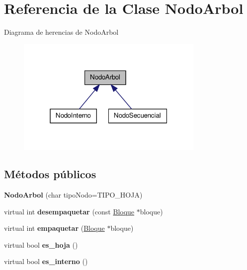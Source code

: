 \hypertarget{class_nodo_arbol}{\section{\-Referencia de la \-Clase \-Nodo\-Arbol}
\label{class_nodo_arbol}
}


\-Diagrama de herencias de \-Nodo\-Arbol
\nopagebreak
\begin{figure}[H]
\begin{center}
\leavevmode
\includegraphics[width=256pt]{class_nodo_arbol__inherit__graph}
\end{center}
\end{figure}
\subsection*{\-Métodos públicos}
\begin{DoxyCompactItemize}
\item 
\hypertarget{class_nodo_arbol_a875a3c766141d83399eb0df1d544fc82}{{\bfseries \-Nodo\-Arbol} (char tipo\-Nodo=\-T\-I\-P\-O\-\_\-\-H\-O\-J\-A)}\label{class_nodo_arbol_a875a3c766141d83399eb0df1d544fc82}

\item 
\hypertarget{class_nodo_arbol_a4b361c0c21de86435efae05e8a18dc1a}{virtual int {\bfseries desempaquetar} (const \hyperlink{class_bloque}{\-Bloque} $\ast$bloque)}\label{class_nodo_arbol_a4b361c0c21de86435efae05e8a18dc1a}

\item 
\hypertarget{class_nodo_arbol_adf47e6e16d0e77a8fcac4f2fd240953e}{virtual int {\bfseries empaquetar} (\hyperlink{class_bloque}{\-Bloque} $\ast$bloque)}\label{class_nodo_arbol_adf47e6e16d0e77a8fcac4f2fd240953e}

\item 
\hypertarget{class_nodo_arbol_a1753a6554622fbc2373ceb4de948d894}{virtual bool {\bfseries es\-\_\-hoja} ()}\label{class_nodo_arbol_a1753a6554622fbc2373ceb4de948d894}

\item 
\hypertarget{class_nodo_arbol_a3e7382fc6f710ea0df23478588a32b85}{virtual bool {\bfseries es\-\_\-interno} ()}\label{class_nodo_arbol_a3e7382fc6f710ea0df23478588a32b85}

\end{DoxyCompactItemize}
